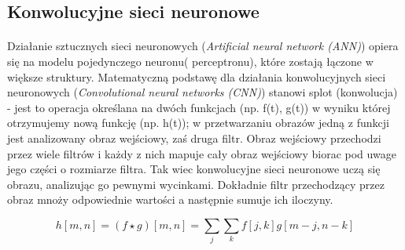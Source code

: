 \documentclass[a4paper,12pt]{article}
\begin{document}
    \subsection{Konwolucyjne sieci neuronowe}
        \paragraph{\indent} Działanie sztucznych sieci neuronowych                        (\textit{Artificial neural network (ANN)}) opiera się na modelu pojedynczego     neuronu( perceptronu), które zostają łączone w większe struktury.
            Matematyczną podstawę dla działania konwolucyjnych sieci neuronowych (\textit{Convolutional neural networks (CNN)}) stanowi splot (konwolucja) - 
            jest to operacja określana na dwóch funkcjach (np. f(t), g(t)) w wyniku której otrzymujemy nową funkcję (np. h(t)); 
            w przetwarzaniu obrazów jedną z funkcji jest analizowany obraz wejściowy,
            zaś druga filtr.
            Obraz wejściowy przechodzi przez wiele filtrów i każdy z nich mapuje cały obraz wejściowy biorac pod uwage jego części o rozmiarze filtra. Tak wiec konwolucyjne sieci neuronowe uczą się obrazu, analizując go pewnymi wycinkami. Dokładnie filtr przechodzący przez obraz mnoży odpowiednie wartości a następnie sumuje ich iloczyny.
        
            \begin{displaymath}
                h[m, n] = ( f \star g)[m, n] = \sum\limits_{j}\sum\limits_{k}f[j, k]g[m-j, n-k]
            \end{displaymath}
		    
		    \newpage
		    
\end{document}
